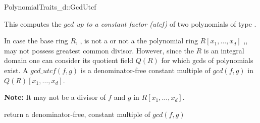 \begin{ccRefConcept}{PolynomialTraits_d::GcdUtcf}

\ccDefinition

This  computes the $gcd$  {\em up to a constant factor (utcf)} 
of two polynomials of type . 

In case the base ring $R$, , 
is not a  or not a  the polynomial ring $R[x_1,\dots,x_d]$ 
,, may not 
possess greatest common divisor. However, since the $R$ is an integral domain one can 
consider its quotient field $Q(R)$ for which gcds of polynomials exist. 
A $gcd\_utcf(f,g)$ is a denominator-free constant multiple of 
$gcd(f,g)$ in $Q(R)[x_1,\dots,x_d]$. 

{\bf Note:} It may not be a divisor of $f$ and $g$ in $R[x_1,\dots,x_d]$.

\ccRefines 


\ccTypes


\ccGlue
{}\ccGlue
{}

\ccOperations

                {return a denominator-free, constant multiple of $gcd(f,g)$}




\ccSeeAlso

\\
\\
\\
\\
\\

\end{ccRefConcept}